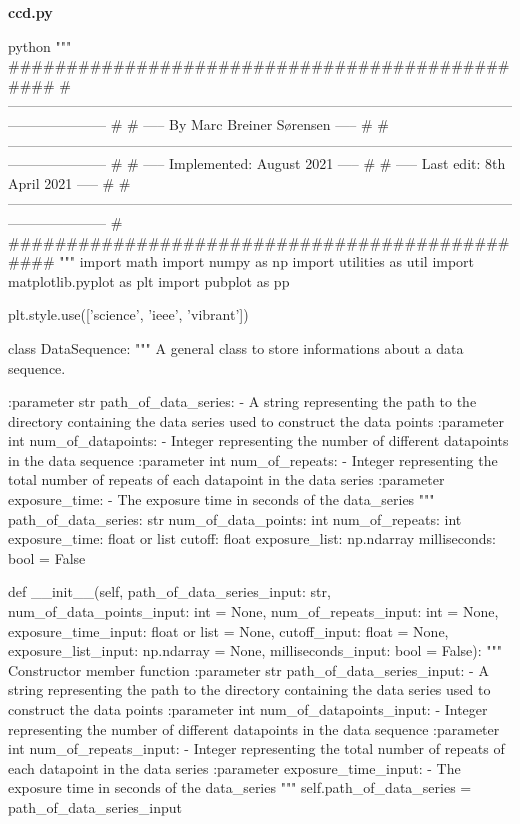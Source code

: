 \documentclass[../main.tex]{subfiles}
\begin{document}
\clearpage
\textbf{ccd.py}
\begin{mintedbox}{python}
"""
###############################################
# --------------------------------------------------------------------------------------------------------------------------------- #
# -----       By Marc Breiner Sørensen        ----- #
# --------------------------------------------------------------------------------------------------------------------------------- #
# ----- Implemented:           August    2021 ----- #
# ----- Last edit:       8th   April     2021 ----- #
# --------------------------------------------------------------------------------------------------------------------------------- #
###############################################
"""
import math
import numpy as np
import utilities as util
import matplotlib.pyplot as plt
import pubplot as pp

plt.style.use(['science', 'ieee', 'vibrant'])


class DataSequence:
"""
A general class to store informations about a data sequence.

:parameter str path_of_data_series:
- A string representing the path to the directory
containing the data series used to construct the data points
:parameter int num_of_datapoints:
- Integer representing the number of different datapoints
in the data sequence
:parameter int num_of_repeats:
- Integer representing the total number of repeats of each datapoint
in the data series
:parameter exposure_time:
- The exposure time in seconds of the data_series
"""
path_of_data_series: str
num_of_data_points: int
num_of_repeats: int
exposure_time: float or list
cutoff: float
exposure_list: np.ndarray
milliseconds: bool  =  False

def __init__(self, path_of_data_series_input: str,
num_of_data_points_input: int  =  None,
num_of_repeats_input: int  =  None,
exposure_time_input: float or list  =  None,
cutoff_input: float  =  None,
exposure_list_input: np.ndarray  =  None,
milliseconds_input: bool  =  False):
"""
Constructor member function
:parameter str path_of_data_series_input:
- A string representing the path to the directory
containing the data series used to construct the data points
:parameter int num_of_datapoints_input:
- Integer representing the number of different datapoints
in the data sequence
:parameter int num_of_repeats_input:
- Integer representing the total number of repeats of each datapoint
in the data series
:parameter exposure_time_input:
- The exposure time in seconds of the data_series
"""
self.path_of_data_series  =  path_of_data_series_input


\end{mintedbox}
\end{document}
